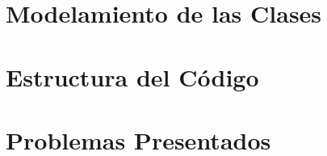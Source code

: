 \documentclass{article}
\begin{document}
\section{Modelamiento de las Clases}
    \subsection{}
        
        
\section{Estructura del Código}
    \subsection{}
    
    
\section{Problemas Presentados}
    \subsection{}
\end{document}

